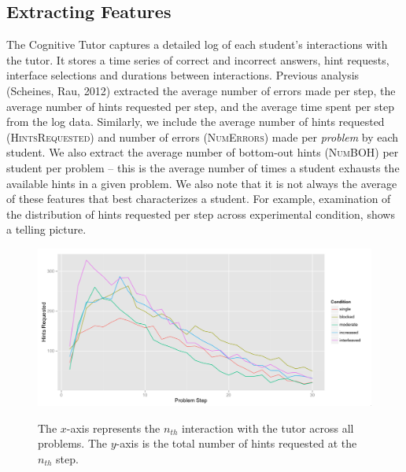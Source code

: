 \documentclass{edm_template}
\newcommand{\ftr}[1]{\textsc{#1}}
\begin{document}
\subsection{Extracting Features}
The Cognitive Tutor captures a detailed log of each student's interactions with the tutor. It stores a time series of correct and incorrect answers, hint requests, interface selections and durations between interactions. Previous analysis (Scheines, Rau, 2012) extracted the average number of errors made per step, the average number of hints requested per step, and the average time spent per step from the log data. Similarly, we include the average number of hints requested (\ftr{HintsRequested}) and number of errors (\ftr{NumErrors}) made per \emph{problem} by each student. We also extract the average number of bottom-out hints (\ftr{NumBOH}) per student per problem -- this is the average number of times a student exhausts the available hints in a given problem. We also note that it is not always the average of these features that best characterizes a student. For example, examination of the distribution of hints requested per step across experimental condition, shows a telling picture. 
\begin{figure}[htbp]
\centering
\includegraphics[scale=.45]{hintsByCondition.png}\\
\caption{The $x$-axis represents the $n_{th}$ interaction with the tutor across all problems. The $y$-axis is the total number of hints requested at the $n_{th}$ step.  }
\label{fig:condition-graph}
\end{figure}
\end{document}
